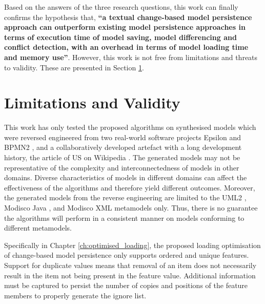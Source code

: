 Based on the answers of the three research questions, this work can finally confirms the hypothesis that, 
\textbf{``a textual change-based model persistence approach can outperform existing model persistence approaches in terms of execution time of model saving, model differencing and conflict detection, with an overhead in terms of model loading time and memory use''}. However, this work is not free from limitations and threats to validity. These are presented in Section \ref{sec:limitation_and_Threat_to_validity}.

\section{Limitations and Validity}
\label{sec:limitation_and_Threat_to_validity}
This work has only tested the proposed algorithms on synthesised models which were reversed engineered from two real-world software projects Epsilon \cite{eclipse2018epsilongit} and BPMN2 \cite{eclipse2018bpmn2git}, and a collaboratively developed artefact with a long development history, the article of US on Wikipedia \cite{wikipedia2018us}. The generated models may not be representative of the complexity and interconnectedness of models in other domains. Diverse characteristics of models in different domains can affect the effectiveness of the algorithms and therefore yield different outcomes. Moreover, the generated models from the reverse engineering are limited to the UML2 \cite{eclipse2017uml2}, Modisco Java \cite{eclipse2018modiscojava}, and Modisco XML \cite{eclipse2018modiscoxml} metamodels only. Thus, there is no guarantee the algorithms will perform in a consistent manner on models conforming to different metamodels.

Specifically in Chapter \ref{ch:optimised_loading}, the proposed loading optimisation of change-based model persistence only supports ordered and unique features. Support for duplicate values means that removal of an item does not necessarily result in the item not being present in the feature value. Additional information must be captured to persist the number of copies and positions of the feature members to properly generate the ignore list. 

